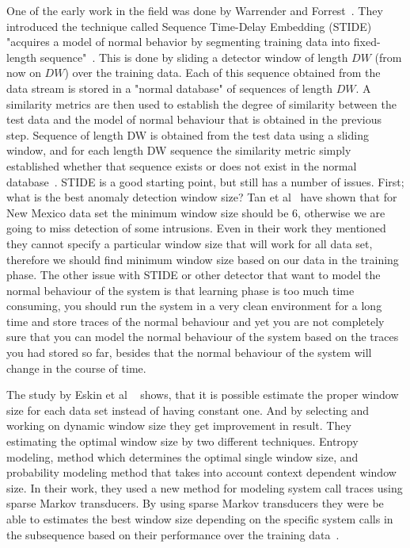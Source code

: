 One of the early work in the field was done by Warrender and Forrest~\cite{Warrender1999}. They introduced the technique called Sequence Time-Delay Embedding (STIDE)  "acquires a model of normal behavior by segmenting training data into fixed-length sequence"~\cite{Warrender1999}. This is done by sliding a detector window of length $DW$ (from now on $DW$) over the training data. Each of this sequence obtained from the data stream is stored in a "normal database" of sequences of length $DW$. A similarity metrics are then used to establish the degree of similarity between the test data and the model of normal behaviour that is obtained in the previous step. Sequence of length DW is obtained from the test data using a sliding window, and for each length DW sequence the similarity metric simply established whether that sequence exists or does not exist in the normal database~\cite{Tan2002}.
STIDE is a good starting point, but still has a number of issues. First; what is the best anomaly detection window size? Tan et al~\cite{Tan2002} have shown that for New Mexico data set the minimum window size should be 6, otherwise we are going to miss detection of some intrusions. Even in their work they mentioned they cannot specify a particular window size that will work for all data set, therefore we should find minimum window size based on our data in the training phase.
The other issue with STIDE or other detector that want to model the normal behaviour of the system is that learning phase is too much time consuming, you should run the system in a very clean environment for a long time and store traces of the normal behaviour and yet you are not completely sure that you can model the normal behaviour of the system based on the traces you had stored so far, besides that the normal behaviour of the system will change in the course of time.

The study by Eskin et al ~\cite{Creech2014} shows, that it is possible estimate the proper window size for each data set instead of having constant one. And by selecting and working on dynamic window size they get improvement in result. They estimating the optimal window size by two different techniques. Entropy modeling, method which determines the optimal single window size, and probability modeling method that takes into account context dependent window size. In their work, they used a new method for modeling system call traces using sparse
Markov transducers. By using sparse
Markov transducers they were be able to estimates the best window size depending on the
specific system calls in the subsequence based on their performance over the training data~\cite{Creech2014}.


